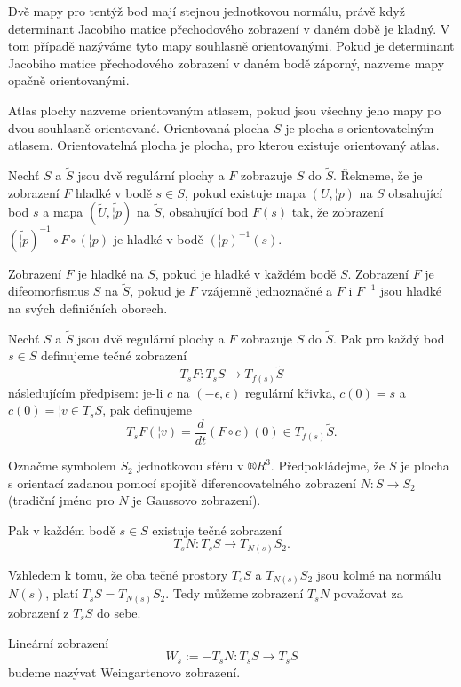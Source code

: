\documentclass[12pt]{article}                   %
\begin{document}
        \begin{poznamka}
            Dvě mapy pro tentýž bod mají stejnou jednotkovou normálu, právě když determinant Jacobiho matice přechodového zobrazení v daném době je kladný. V tom případě nazýváme tyto mapy souhlasně orientovanými. Pokud je determinant Jacobiho matice přechodového zobrazení v daném bodě záporný, nazveme mapy opačně orientovanými.

            Atlas plochy nazveme orientovaným atlasem, pokud jsou všechny jeho mapy po dvou souhlasně orientované. Orientovaná plocha $S$ je plocha s orientovatelným atlasem. Orientovatelná plocha je plocha, pro kterou existuje orientovaný atlas.
        \end{poznamka}

        \begin{definice}
            Nechť $S$ a $\tilde{S}$ jsou dvě regulární plochy a $F$ zobrazuje $S$ do $\tilde{S}$. Řekneme, že je zobrazení $F$ hladké v bodě $s \in S$, pokud existuje mapa $(U, ¦p)$ na $S$ obsahující bod $s$ a mapa $(\tilde{U}, \tilde{¦p})$ na $\tilde{S}$, obsahující bod $F(s)$ tak, že zobrazení $(\tilde{¦p})^{-1}\circ F \circ (¦p)$ je hladké v bodě $(¦p)^{-1}(s)$.

            Zobrazení $F$ je hladké na $S$, pokud je hladké v každém bodě $S$. Zobrazení $F$ je difeomorfismus $S$ na $\tilde{S}$, pokud je $F$ vzájemně jednoznačné a $F$ i $F^{-1}$ jsou hladké na svých definičních oborech.
        \end{definice}

        \begin{definice}
            Nechť $S$ a $\tilde{S}$ jsou dvě regulární plochy a $F$ zobrazuje $S$ do $\tilde{S}$. Pak pro každý bod $s \in S$ definujeme tečné zobrazení
            $$ T_sF: T_sS \rightarrow T_{f(s)}\tilde{S} $$
            následujícím předpisem: je-li $c$ na $(-\epsilon, \epsilon)$ regulární křivka, $c(0) = s$ a $\dot{c}(0) = ¦v \in T_sS$, pak definujeme
            $$ T_sF(¦v) = \frac{d}{dt}(F \circ c)(0) \in T_{f(s)}\tilde{S}. $$ 
        \end{definice}

        \begin{definice}
            Označme symbolem $S_2$ jednotkovou sféru v $®R^3$. Předpokládejme, že $S$ je plocha s orientací zadanou pomocí spojitě diferencovatelného zobrazení $N: S \rightarrow S_2$ (tradiční jméno pro $N$ je Gaussovo zobrazení).

            Pak v každém bodě $s \in S$ existuje tečné zobrazení
            $$ T_sN: T_sS \rightarrow T_{N(s)}S_2. $$

            Vzhledem k tomu, že oba tečné prostory $T_sS$ a $T_{N(s)}S_2$ jsou kolmé na normálu $N(s)$, platí $T_sS = T_{N(s)}S_2$. Tedy můžeme zobrazení $T_sN$ považovat za zobrazení z $T_sS$ do sebe.

            Lineární zobrazení
            $$ W_s := -T_sN: T_sS \rightarrow T_sS $$
            budeme nazývat Weingartenovo zobrazení.
        \end{definice}
\end{document}
